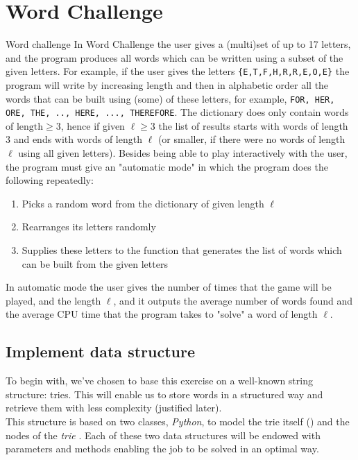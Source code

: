 \documentclass[10pt,a4paper,hidelinks]{article}
\begin{document}
\section{Word Challenge}
\begin{exercise_description}{Word challenge}
    In Word Challenge the user gives a (multi)set of up to 17 letters, and the program produces all words which can be written using a subset of the given letters. For example, if the user gives the letters \verb|{E,T,F,H,R,R,E,O,E}| the program will write by increasing length and then in alphabetic order all the words that can be built using (some) of these letters, for example, \verb|FOR, HER, ORE, THE, .., HERE, ..., THEREFORE|. The dictionary does only contain words of $\text{length}\geqslant  3$, hence if given $\ell \geqslant 3$ the list of results starts with words of length 3 and ends with words of length $\ell$ (or smaller, if there were no words of length $\ell$ using all given letters). Besides being able to play interactively with the user, the program must give an "automatic mode" in which the program does the following repeatedly:
    \begin{enumerate}
    \item Picks a random word from the dictionary of given length $\ell$
    \item Rearranges its letters randomly
    \item Supplies these letters to the function that generates the list of words which can be built from the given letters
    \end{enumerate}
    In automatic mode the user gives the number of times that the game will be played, and the length $\ell$, and it outputs the average number of words found and the average CPU time that the program takes to "solve" a word of length $\ell$.
\end{exercise_description}


\subsection{Implement  data structure}
To begin with, we've chosen to base this exercise on a well-known string structure: tries. This will enable us to store words in a structured way and retrieve them with less complexity (justified later).\\
This structure is based on two classes, \textit{Python}, to model the trie itself () and the nodes of the \textit{trie} . Each of these two data structures will be endowed with parameters and methods enabling the job to be solved in an optimal way.
\end{document}
